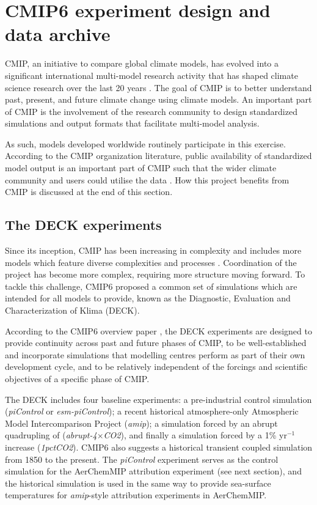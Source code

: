 \section{CMIP6 experiment design and data archive}
\label{sec:2.CMIP6}

CMIP, an initiative to compare global climate models, has evolved into a significant international multi-model research activity that has shaped climate science research over the last 20 years \citep{eyringOverviewCoupledModel2016}. The goal of CMIP is to better understand past, present, and future climate change using climate models. An important part of CMIP is the involvement of the research community to design standardized simulations and output formats that facilitate multi-model analysis. 

As such, models developed worldwide routinely participate in this exercise. According to the CMIP organization literature, public availability of standardized model output is an important part of CMIP such that the wider climate community and users could utilise the data \citep{eyringOverviewCoupledModel2016}. How this project benefits from CMIP is discussed at the end of this section.

\subsection{The DECK experiments}

Since its inception, CMIP has been increasing in complexity and includes more models which feature diverse complexities and processes \citep{eyringOverviewCoupledModel2016}. Coordination of the project has become more complex, requiring more structure moving forward. To tackle this challenge, CMIP6 proposed a common set of simulations which are intended for all models to provide, known as the Diagnostic, Evaluation and Characterization of Klima (DECK). 

According to the CMIP6 overview paper \citep{eyringOverviewCoupledModel2016}, the DECK experiments are designed to provide continuity across past and future phases of CMIP, to be well-established and incorporate simulations that modelling centres perform as part of their own development cycle, and to be relatively independent of the forcings and scientific objectives of a specific phase of CMIP. 

The DECK includes four baseline experiments: a pre-industrial control simulation (\textit{piControl} or \textit{esm-piControl}); a recent historical atmosphere-only Atmospheric Model Intercomparison Project (\textit{amip}); a simulation forced by an abrupt quadrupling of  (\textit{abrupt-4$\times$CO2}), and finally a simulation forced by a 1\% yr$^{-1}$  increase (\textit{1pctCO2}). CMIP6 also suggests a historical transient coupled simulation from 1850 to the present.  The \textit{piControl} experiment serves as the control simulation for the AerChemMIP attribution experiment (see next section), and the historical simulation is used in the same way to provide sea-surface temperatures for \textit{amip}-style attribution experiments in AerChemMIP.

